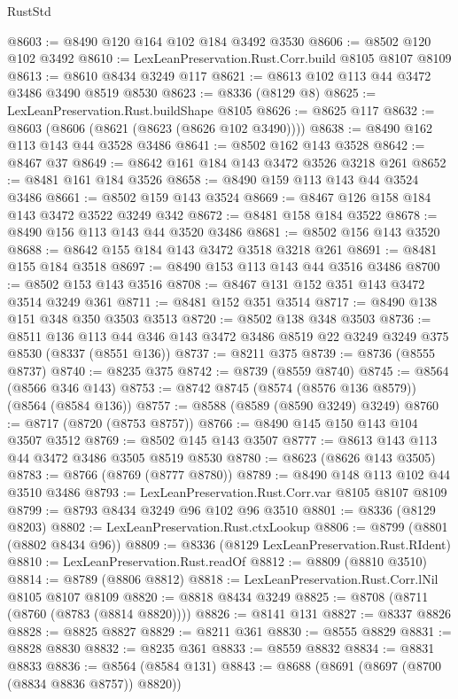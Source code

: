 \begin{lexlean}{RustStd}
\begin{coremodule}
@8603 := @8490 @120 @164 @102 @184 @3492 @3530
@8606 := @8502 @120 @102 @3492
@8610 := LexLeanPreservation.Rust.Corr.build @8105 @8107 @8109
@8613 := @8610 @8434 @3249 @117
@8621 := @8613 @102 @113 @44 @3472 @3486 @3490 @8519 @8530
@8623 := @8336 (@8129 @8)
@8625 := LexLeanPreservation.Rust.buildShape @8105
@8626 := @8625 @117
@8632 := @8603 (@8606 (@8621 (@8623 (@8626 @102 @3490))))
@8638 := @8490 @162 @113 @143 @44 @3528 @3486
@8641 := @8502 @162 @143 @3528
@8642 := @8467 @37
@8649 := @8642 @161 @184 @143 @3472 @3526 @3218 @261
@8652 := @8481 @161 @184 @3526
@8658 := @8490 @159 @113 @143 @44 @3524 @3486
@8661 := @8502 @159 @143 @3524
@8669 := @8467 @126 @158 @184 @143 @3472 @3522 @3249 @342
@8672 := @8481 @158 @184 @3522
@8678 := @8490 @156 @113 @143 @44 @3520 @3486
@8681 := @8502 @156 @143 @3520
@8688 := @8642 @155 @184 @143 @3472 @3518 @3218 @261
@8691 := @8481 @155 @184 @3518
@8697 := @8490 @153 @113 @143 @44 @3516 @3486
@8700 := @8502 @153 @143 @3516
@8708 := @8467 @131 @152 @351 @143 @3472 @3514 @3249 @361
@8711 := @8481 @152 @351 @3514
@8717 := @8490 @138 @151 @348 @350 @3503 @3513
@8720 := @8502 @138 @348 @3503
@8736 := @8511
    @136
    @113
    @44
    @346
    @143
    @3472
    @3486
    @8519
    @22
    @3249
    @3249
    @375
    @8530
    (@8337 (@8551 @136))
@8737 := @8211 @375
@8739 := @8736 (@8555 @8737)
@8740 := @8235 @375
@8742 := @8739 (@8559 @8740)
@8745 := @8564 (@8566 @346 @143)
@8753 := @8742 @8745 (@8574 (@8576 @136 @8579)) (@8564 (@8584 @136))
@8757 := @8588 (@8589 (@8590 @3249) @3249)
@8760 := @8717 (@8720 (@8753 @8757))
@8766 := @8490 @145 @150 @143 @104 @3507 @3512
@8769 := @8502 @145 @143 @3507
@8777 := @8613 @143 @113 @44 @3472 @3486 @3505 @8519 @8530
@8780 := @8623 (@8626 @143 @3505)
@8783 := @8766 (@8769 (@8777 @8780))
@8789 := @8490 @148 @113 @102 @44 @3510 @3486
@8793 := LexLeanPreservation.Rust.Corr.var @8105 @8107 @8109
@8799 := @8793 @8434 @3249 @96 @102 @96 @3510
@8801 := @8336 (@8129 @8203)
@8802 := LexLeanPreservation.Rust.ctxLookup
@8806 := @8799 (@8801 (@8802 @8434 @96))
@8809 := @8336 (@8129 LexLeanPreservation.Rust.RIdent)
@8810 := LexLeanPreservation.Rust.readOf
@8812 := @8809 (@8810 @3510)
@8814 := @8789 (@8806 @8812)
@8818 := LexLeanPreservation.Rust.Corr.lNil @8105 @8107 @8109
@8820 := @8818 @8434 @3249
@8825 := @8708 (@8711 (@8760 (@8783 (@8814 @8820))))
@8826 := @8141 @131
@8827 := @8337 @8826
@8828 := @8825 @8827
@8829 := @8211 @361
@8830 := @8555 @8829
@8831 := @8828 @8830
@8832 := @8235 @361
@8833 := @8559 @8832
@8834 := @8831 @8833
@8836 := @8564 (@8584 @131)
@8843 := @8688 (@8691 (@8697 (@8700 (@8834 @8836 @8757)) @8820))

\end{coremodule}
\end{lexlean}
